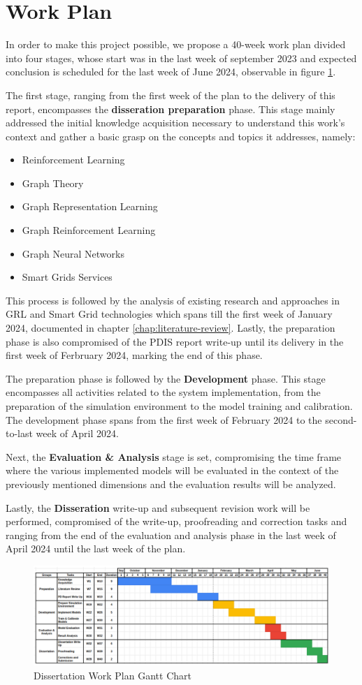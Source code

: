 \section{Work Plan}

In order to make this project possible, we propose a 40-week work plan divided into four stages, whose start was in the last week of september 2023 and expected conclusion is scheduled for the last week of June 2024, observable in figure \ref{fig:gantt-chart}. \par
The first stage, ranging from the first week of the plan to the delivery of this report, encompasses the \textbf{disseration preparation} phase. This stage mainly addressed the initial knowledge acquisition necessary to understand this work's context and gather a basic grasp on the concepts and topics it addresses, namely:
\begin{itemize}
	 \item Reinforcement Learning
	\item Graph Theory
	\item Graph Representation Learning
	\item Graph Reinforcement Learning
	\item Graph Neural Networks
	\item Smart Grids Services
\end{itemize}
This process is followed by the analysis of existing research and approaches in \ac{GRL} and Smart Grid technologies which spans till the first week of January 2024, documented in chapter \ref{chap:literature-review}. Lastly, the preparation phase is also compromised of the PDIS report write-up until its delivery in the first week of Ferbruary 2024, marking the end of this phase. \par
The preparation phase is followed by the \textbf{Development} phase. This stage encompasses all activities related to the system implementation, from the preparation of the simulation environment to the model training and calibration. The development phase spans from the first week of February 2024 to the second-to-last week of April 2024. \par
Next, the \textbf{Evaluation \& Analysis} stage is set, compromising the time frame where the various implemented models will be evaluated in the context of the previously mentioned dimensions and the evaluation results will be analyzed. \par
Lastly, the \textbf{Disseration} write-up and subsequent revision work will be performed, compromised of the write-up, proofreading and correction tasks and ranging from the end of the evaluation and analysis phase in the last week of April 2024 until the last week of the plan.

\begin{figure}
	\includegraphics[width=1.0\linewidth]{./figures/gantt-chart.png}
	\caption{Dissertation Work Plan Gantt Chart}
	\label{fig:gantt-chart}
\end{figure}

